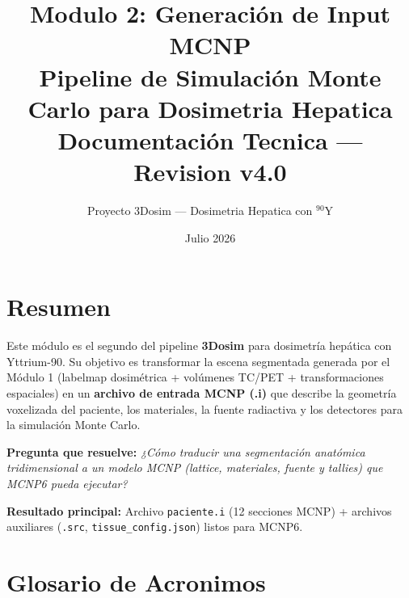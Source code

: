\documentclass[12pt,a4paper]{article}
\title{\textbf{Modulo 2: Generación de Input MCNP}\\[0.5cm]
       \large Pipeline de Simulación Monte Carlo para Dosimetria Hepatica\\[0.3cm]
       \normalsize Documentación Tecnica --- Revision v4.0}
\author{Proyecto 3Dosim --- Dosimetria Hepatica con $^{90}$Y}
\date{Julio 2026}
\begin{document}
\maketitle
\thispagestyle{empty}
\newpage


\section*{Resumen}

Este módulo es el segundo del pipeline \textbf{3Dosim} para dosimetría hepática con Yttrium-90.
Su objetivo es transformar la escena segmentada generada por el Módulo 1 (labelmap dosimétrica + volúmenes TC/PET + transformaciones espaciales) en un \textbf{archivo de entrada MCNP (.i)} que describe la geometría voxelizada del paciente, los materiales, la fuente radiactiva y los detectores para la simulación Monte Carlo.

\vspace{0.5em}
\noindent
\textbf{Pregunta que resuelve:} \textit{¿Cómo traducir una segmentación anatómica tridimensional a un modelo MCNP (lattice, materiales, fuente y tallies) que MCNP6 pueda ejecutar?}

\vspace{0.3em}
\noindent
\textbf{Resultado principal:} Archivo \texttt{paciente.i} (12 secciones MCNP) + archivos auxiliares (\texttt{.src}, \texttt{tissue\_config.json}) listos para MCNP6.


\section*{Glosario de Acronimos}
\end{document}

